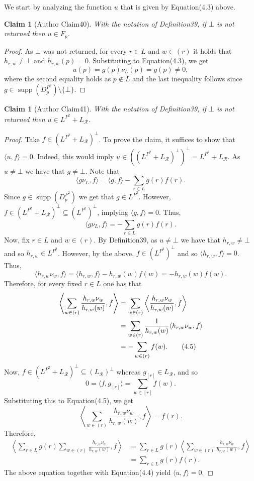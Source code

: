 \documentclass[10pt,a4paper]{article}
\newtheorem{ntclaim}[nttheorem]{Claim}
\begin{document}
We start by analyzing the function $u$ that is given by Equation(4.3) above.
\begin{ntclaim}[Author Claim40]
With the notation of Definition39, if $\bot$ is not returned then $u\in F_p$.
\end{ntclaim}
\begin{proof}
As $\bot$ was not returned, for every $r\in L$ and $w\in(r)$ it holds that $h_{r,w}\ne\bot$ and $h_{r,w}(p)=0$. Substituting to Equation(4.3), we get
\[u(p)=g(p)\nu_L(p)=g(p)\ne0,\]
where the second equality holds as $p\notin L$ and the last inequality follows since $g\in\operatorname{supp}(D_p^{P^2})\setminus\{\bot\}$.
\end{proof}
\begin{ntclaim}[Author Claim41]
With the notation of Definition39, if $\bot$ is not returned then $u\in L^{P^2}+L_{\mathcal R}$.
\end{ntclaim}
\begin{proof}
Take $f\in(L^{P^2}+L_{\mathcal R})^\perp$. To prove the claim, it suffices to show that $\langle u,f\rangle=0$. Indeed, this would imply $u\in((L^{P^2}+L_{\mathcal R})^\perp)^\perp=L^{P^2}+L_{\mathcal R}$. As $u\ne\bot$ we have that $g\ne\bot$. Note that
\[\langle g\nu_L,f\rangle=\langle g,f\rangle-\sum_{r\in L}g(r)f(r).\]
Since $g\in\operatorname{supp}(D_p^{P^2})$ we get that $g\in L^{P^2}$. However, $f\in(L^{P^2}+L_{\mathcal R})^\perp\subseteq(L^{P^2})^\perp$, implying $\langle g,f\rangle=0$. Thus,
\begin{equation}\langle g\nu_L,f\rangle=-\sum_{r\in L}g(r)f(r).\tag{4.4}\end{equation}
Now, fix $r\in L$ and $w\in(r)$. By Definition39, as $u\ne\bot$ we have that $h_{r,w}\ne\bot$ and so $h_{r,w}\in L^{P^2}$. However, by the above, $f\in(L^{P^2})^\perp$ and so $\langle h_{r,w},f\rangle=0$. Thus,
\[\langle h_{r,w}\nu_w,f\rangle=\langle h_{r,w},f\rangle-h_{r,w}(w)f(w)=-h_{r,w}(w)f(w).\]
Therefore, for every fixed $r\in L$ one has that
\begin{align}\left\langle\sum_{w\in(r)}\frac{h_{r,w}\nu_w}{h_{r,w}(w)},f\right\rangle&=\sum_{w\in(r)}\left\langle\frac{h_{r,w}\nu_w}{h_{r,w}(w)},f\right\rangle\notag\\&=\sum_{w\in(r)}\frac1{h_{r,w}(w)}\langle h_{r,w}\nu_w,f\rangle\notag\\&=-\sum_{w\in(r)}f(w).\tag{4.5}\end{align}
Now, $f\in(L^{P^2}+L_{\mathcal R})^\perp\subseteq(L_{\mathcal R})^\perp$ whereas $g_{[r]}\in L_{\mathcal R}$, and so
\[0=\langle f,g_{[r]}\rangle=\sum_{w\in[r]}f(w).\]
Substituting this to Equation(4.5), we get
\[\left\langle\sum_{w\in(r)}\frac{h_{r,w}\nu_w}{h_{r,w}(w)},f\right\rangle=f(r).\]
Therefore,
\begin{align*}\left\langle\sum_{r\in L}g(r)\sum_{w\in(r)}\frac{h_{r,w}\nu_w}{h_{r,w}(w)},f\right\rangle&=\sum_{r\in L}g(r)\left\langle\sum_{w\in(r)}\frac{h_{r,w}\nu_w}{h_{r,w}(w)},f\right\rangle\\&=\sum_{r\in L}g(r)f(r).\end{align*}
The above equation together with Equation(4.4) yield $\langle u,f\rangle=0$.
\end{proof}
\end{document}
